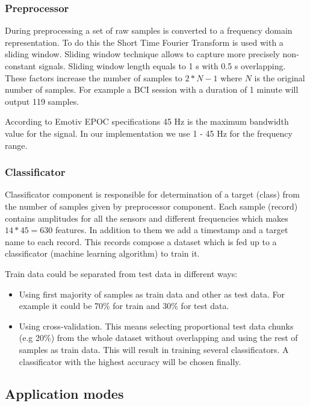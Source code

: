 \documentclass[12pt]{article}
\begin{document}
\subsubsection{Preprocessor}

During preprocessing a set of raw samples is converted to a frequency domain representation. To do this the Short Time Fourier Transform is used with a sliding window. Sliding window technique allows to capture more precisely non-constant signals. Sliding window length equals to 1 s with 0.5 s overlapping. These factors increase the number of samples to $2*N-1$ where $N$ is the original number of samples. For example a BCI session with a duration of 1 minute will output 119 samples.

According to Emotiv EPOC specifications\cite{emotiv} 45 Hz is the maximum bandwidth value for the signal. In our implementation we use 1 - 45 Hz for the frequency range.

\subsubsection{Classificator}

Classificator component is responsible for determination of a target (class) from the number of samples given by preprocessor component. Each sample (record) contains amplitudes for all the sensors and different frequencies which makes $14*45=630$ features. In addition to them we add a timestamp and a target name to each record. This records compose a dataset which is fed up to a classificator (machine learning algorithm) to train it. 

Train data could be separated from test data in different ways:

\begin{itemize}
\item Using first majority of samples as train data and other as test data. For example it could be 70\% for train and 30\% for test data.
\item Using cross-validation. This means selecting proportional test data chunks (e.g 20\%) from the whole dataset without overlapping and using the rest of samples as train data. This will result in training several classificators. A classificator with the highest accuracy will be chosen finally.
\end{itemize}

\subsection{Application modes}
\end{document}
